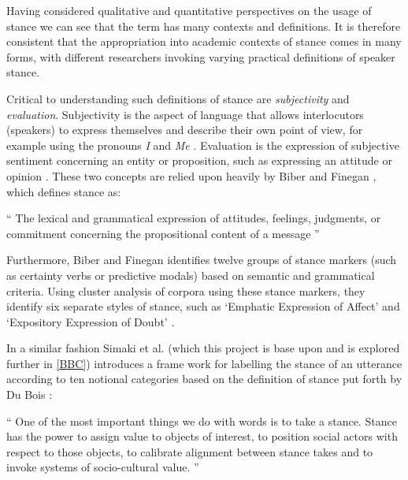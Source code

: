 \documentclass[Dissertation.tex]{subfiles}
\begin{document}

Having considered qualitative and quantitative perspectives on the usage of stance we can see that the term has many contexts and definitions.  It is therefore consistent that the appropriation into academic contexts of stance comes in many forms, with different researchers invoking varying practical definitions of speaker stance.

Critical to understanding such definitions of stance are \textit{subjectivity} and \textit{evaluation}. Subjectivity is the aspect of language that allows interlocutors (speakers)  to express themselves and describe their own point of view, for example using the pronouns \textit{I} and \textit{Me} \cite{matthewsSubjectivity2014}. Evaluation is the expression of subjective sentiment concerning an entity or proposition, such as expressing an attitude or opinion \cite{hunstonEvaluationTextAuthorial2000}. These two concepts are relied upon heavily by Biber and Finegan \cite{biberStylesStanceEnglish1989}, which defines stance as:

\begin{displayquote} `` The lexical and grammatical expression of attitudes, feelings, judgments, or commitment concerning the propositional content of a message ''
\end{displayquote}


Furthermore, Biber and Finegan \cite{biberStylesStanceEnglish1989} identifies twelve groups of stance markers (such as certainty verbs or predictive modals) based on semantic and grammatical criteria. Using cluster analysis of corpora using these stance markers, they identify six separate styles of stance, such as ‘Emphatic Expression of Affect’ and ‘Expository Expression of Doubt’ \cite{biberStylesStanceEnglish1989}. 

In a similar fashion Simaki et al. \cite{simakiAnnotatingSpeakerStance2017} (which this project is base upon and is explored further in \ref{BBC}) introduces a frame work for labelling the stance of an utterance according to ten notional categories based on the definition of stance put forth by Du Bois \cite{duboisStanceTriangle2007}:

\begin{displayquote}
	`` One of the most important things we do with words is to take a stance. Stance has the power to assign value to objects of interest, to position social actors with respect to those objects, to calibrate alignment between stance takes and to invoke systems of socio-cultural value. ''
\end{displayquote}
\end{document}
